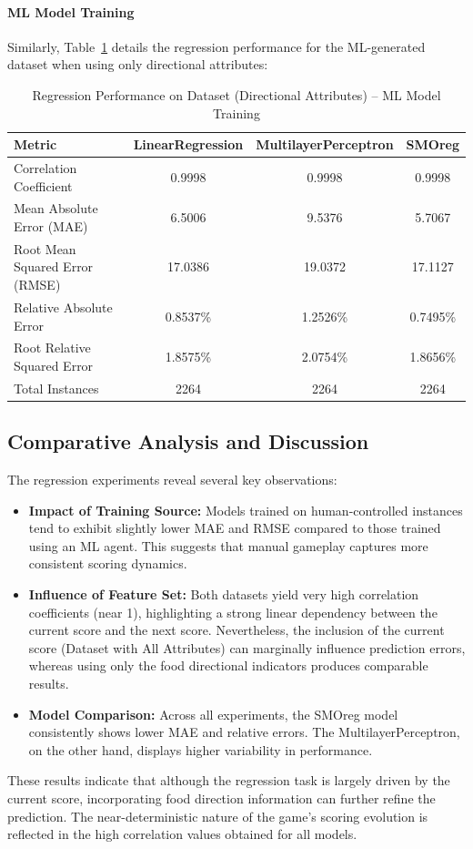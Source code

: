 \documentclass[12pt,a4paper]{article}
\begin{document}
\paragraph{ML Model Training}
Similarly, Table~\ref{tab:dir_ml} details the regression performance for the ML-generated dataset when using only directional attributes:
\begin{table}[ht]
    \caption{Regression Performance on Dataset (Directional Attributes) -- ML Model Training}
    \label{tab:dir_ml}
    \centering
    \begin{tabular}{lccc}
        \toprule
        \textbf{Metric} & \textbf{LinearRegression} & \textbf{MultilayerPerceptron} & \textbf{SMOreg} \\
        \midrule
        Correlation Coefficient & 0.9998 & 0.9998 & 0.9998 \\
        Mean Absolute Error (MAE) & 6.5006 & 9.5376 & 5.7067 \\
        Root Mean Squared Error (RMSE) & 17.0386 & 19.0372 & 17.1127 \\
        Relative Absolute Error & 0.8537\% & 1.2526\% & 0.7495\% \\
        Root Relative Squared Error & 1.8575\% & 2.0754\% & 1.8656\% \\
        Total Instances & 2264 & 2264 & 2264 \\
        \bottomrule
    \end{tabular}
\end{table}

\subsection{Comparative Analysis and Discussion}
The regression experiments reveal several key observations:
\begin{itemize}
    \item \textbf{Impact of Training Source:} Models trained on human-controlled instances tend to exhibit slightly lower MAE and RMSE compared to those trained using an ML agent. This suggests that manual gameplay captures more consistent scoring dynamics.
    \item \textbf{Influence of Feature Set:} Both datasets yield very high correlation coefficients (near 1), highlighting a strong linear dependency between the current score and the next score. Nevertheless, the inclusion of the current score (Dataset with All Attributes) can marginally influence prediction errors, whereas using only the food directional indicators produces comparable results.
    \item \textbf{Model Comparison:} Across all experiments, the SMOreg model consistently shows lower MAE and relative errors. The MultilayerPerceptron, on the other hand, displays higher variability in performance.
\end{itemize}
These results indicate that although the regression task is largely driven by the current score, incorporating food direction information can further refine the prediction. The near-deterministic nature of the game’s scoring evolution is reflected in the high correlation values obtained for all models.
\end{document}
